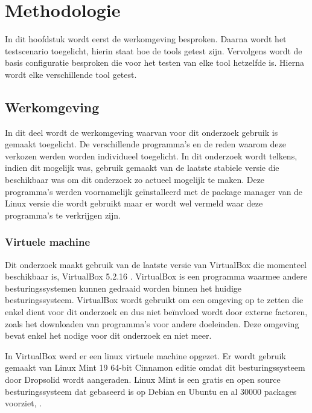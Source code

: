 
\chapter{Methodologie}
\label{ch:methodologie}
In dit hoofdstuk wordt eerst de werkomgeving besproken. Daarna wordt het testscenario toegelicht, hierin staat hoe de \glspl{tool} getest zijn. Vervolgens wordt de basis configuratie besproken die voor het testen van elke \gls{tool} hetzelfde is. Hierna wordt elke verschillende \gls{tool} getest.

\clearpage
\section{Werkomgeving}
In dit deel wordt de werkomgeving waarvan voor dit onderzoek gebruik is gemaakt toegelicht. De verschillende programma's en de reden waarom deze verkozen werden worden individueel toegelicht. In dit onderzoek wordt telkens, indien dit mogelijk was, gebruik gemaakt van de laatste stabiele versie die beschikbaar was om dit onderzoek zo actueel mogelijk te maken. Deze programma's werden voornamelijk geïnstalleerd met de package manager van de Linux versie die wordt gebruikt maar er wordt wel vermeld waar deze programma's te verkrijgen zijn.

\subsection{Virtuele machine}
Dit onderzoek maakt gebruik van de laatste versie van VirtualBox die momenteel beschikbaar is, VirtualBox 5.2.16 \textcite{VirtualBox}. VirtualBox is een programma waarmee andere besturingssystemen kunnen gedraaid worden binnen het huidige besturingssysteem. VirtualBox wordt gebruikt om een omgeving op te zetten die enkel dient voor dit onderzoek en dus niet beïnvloed wordt door externe factoren, zoals het downloaden van programma's voor andere doeleinden. Deze omgeving bevat enkel het nodige voor dit onderzoek en niet meer. 

In VirtualBox werd er een linux virtuele machine opgezet. Er wordt gebruik gemaakt van Linux Mint 19 64-bit Cinnamon editie omdat dit besturingssysteem door Dropsolid wordt aangeraden. Linux Mint is een gratis en open source besturingssysteem dat gebaseerd is op Debian en Ubuntu en al 30000 packages voorziet, \textcite{LinuxMint}.

